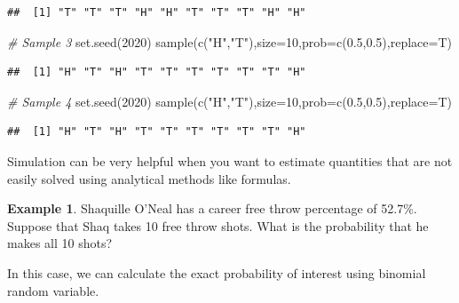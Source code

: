 \documentclass[
  11pt,
]{book}
\newenvironment{Shaded}{\begin{snugshade}}{\end{snugshade}}
\newcommand{\AttributeTok}[1]{\textcolor[rgb]{0.77,0.63,0.00}{#1}}
\newcommand{\CommentTok}[1]{\textcolor[rgb]{0.56,0.35,0.01}{\textit{#1}}}
\newcommand{\DecValTok}[1]{\textcolor[rgb]{0.00,0.00,0.81}{#1}}
\newcommand{\FloatTok}[1]{\textcolor[rgb]{0.00,0.00,0.81}{#1}}
\newcommand{\FunctionTok}[1]{\textcolor[rgb]{0.00,0.00,0.00}{#1}}
\newcommand{\NormalTok}[1]{#1}
\newcommand{\StringTok}[1]{\textcolor[rgb]{0.31,0.60,0.02}{#1}}
\theoremstyle{definition}
\theoremstyle{definition}
\newtheorem{example}{Example}[chapter]
\theoremstyle{definition}
\theoremstyle{definition}
\theoremstyle{remark}
\begin{document}
\begin{verbatim}
##  [1] "T" "T" "T" "H" "H" "T" "T" "T" "H" "H"
\end{verbatim}

\begin{Shaded}
\begin{Highlighting}[]
\CommentTok{\# Sample 3}
\FunctionTok{set.seed}\NormalTok{(}\DecValTok{2020}\NormalTok{)}
\FunctionTok{sample}\NormalTok{(}\FunctionTok{c}\NormalTok{(}\StringTok{"H"}\NormalTok{,}\StringTok{"T"}\NormalTok{),}\AttributeTok{size=}\DecValTok{10}\NormalTok{,}\AttributeTok{prob=}\FunctionTok{c}\NormalTok{(}\FloatTok{0.5}\NormalTok{,}\FloatTok{0.5}\NormalTok{),}\AttributeTok{replace=}\NormalTok{T)}
\end{Highlighting}
\end{Shaded}

\begin{verbatim}
##  [1] "H" "T" "H" "T" "T" "T" "T" "T" "T" "H"
\end{verbatim}

\begin{Shaded}
\begin{Highlighting}[]
\CommentTok{\# Sample 4}
\FunctionTok{set.seed}\NormalTok{(}\DecValTok{2020}\NormalTok{)}
\FunctionTok{sample}\NormalTok{(}\FunctionTok{c}\NormalTok{(}\StringTok{"H"}\NormalTok{,}\StringTok{"T"}\NormalTok{),}\AttributeTok{size=}\DecValTok{10}\NormalTok{,}\AttributeTok{prob=}\FunctionTok{c}\NormalTok{(}\FloatTok{0.5}\NormalTok{,}\FloatTok{0.5}\NormalTok{),}\AttributeTok{replace=}\NormalTok{T)}
\end{Highlighting}
\end{Shaded}

\begin{verbatim}
##  [1] "H" "T" "H" "T" "T" "T" "T" "T" "T" "H"
\end{verbatim}

\vfill
\newpage

Simulation can be very helpful when you want to estimate quantities that are not easily solved using analytical methods like formulas.

\begin{example}
Shaquille O'Neal has a career free throw percentage of 52.7\%. Suppose that Shaq takes 10 free throw shots. What is the probability that he makes all 10 shots?
\end{example}

In this case, we can calculate the exact probability of interest using binomial random variable.
\end{document}
